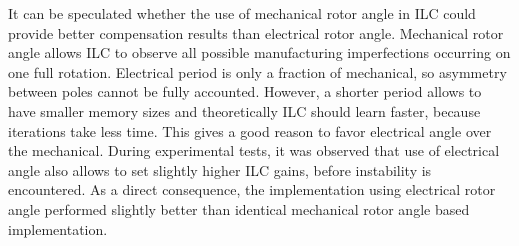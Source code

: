 It can be speculated whether the use of mechanical rotor angle in ILC could provide better compensation results than electrical rotor angle. Mechanical rotor angle allows ILC to observe all possible manufacturing imperfections occurring on one full rotation. Electrical period is only a fraction of mechanical, so asymmetry between poles cannot be fully accounted. However, a shorter period allows to have smaller memory sizes and theoretically ILC should learn faster, because iterations take less time. This gives a good reason to favor electrical angle over the mechanical. During experimental tests, it was observed that use of electrical angle also allows to set slightly higher ILC gains, before instability is encountered. As a direct consequence, the implementation using electrical rotor angle performed slightly better than identical mechanical rotor angle based implementation.






